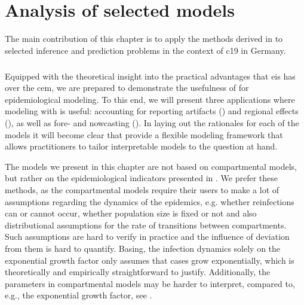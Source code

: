 \chapter{Analysis of selected models}
\label{cha:analysis_of_selected_models}
\newpage
\begin{tcolorbox}[title={Contributions of this chapter}]
    The main contribution of this chapter is to apply the methods derived in  to selected inference and prediction problems in the context of \acrshort{c19} in Germany.
    \paragraph{}
    \phantom{stuff}
    \paragraph{}
    \phantom{stuff}
    \paragraph{}
    \phantom{stuff}
\end{tcolorbox}
\newpage
Equipped with the theoretical insight into the practical advantages that \acrshort{eis} has over the \acrshort{cem}, we are prepared to demonstrate the usefulness of  for epidemiological modeling. To this end, we will present three applications where modeling with  is useful: accounting for reporting artifacts () and regional effects (), as well as fore- and nowcasting (). In laying out the rationales for each of the models it will become clear that  provide a flexible modeling framework that allows practitioners to tailor interpretable models to the question at hand. 

The models we present in this chapter are not based on compartmental models, but rather on the epidemiological indicators presented in . We prefer these methods, as the compartmental models require their users to make a lot of assumptions regarding the dynamics of the epidemics, e.g. whether reinfections can or cannot occur, whether population size is fixed or not and also distributional assumptions for the rate of transitions between compartments. 
Such assumptions are hard to verify in practice and the influence of deviation from them is hard to quantify. Basing, the infection dynamics solely on the exponential growth factor only assumes that cases grow exponentially, which is theoretically and empirically straightforward to justify. 
Additionally, the parameters in compartmental models may be harder to interpret, compared to, e.g., the exponential growth factor, see .

